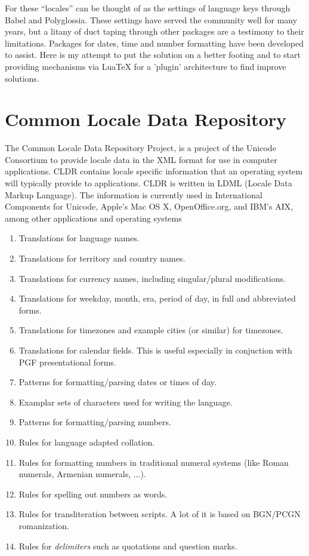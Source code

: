 For \latex these ``locales'' can be thought of as the settings of language keys through Babel and Polyglossia. These settings have served the community well for many years, but a litany of duct taping through other packages are a testimony to their limitations. Packages for dates, time and number formatting have been developed to assist. Here is my attempt to put the solution on a better footing and to start providing mechanisms via LuaTeX for a 'plugin'
architecture to find improve solutions. 

\section{Common Locale Data Repository}

The Common Locale Data Repository Project, is a project of the Unicode Consortium to provide locale data in the XML format for use in computer applications. CLDR contains locale specific information that an operating system will typically provide to applications. CLDR is written in LDML (Locale Data Markup Language). The information is currently used in International Components for Unicode, Apple's Mac OS X, OpenOffice.org, and IBM's AIX, among other applications and operating systems

\begin{enumerate}
\item Translations for language names.
\item Translations for territory and country names.
\item Translations for currency names, including singular/plural modifications.
\item Translations for weekday, month, era, period of day, in full and abbreviated forms.
\item Translations for timezones and example cities (or similar) for timezones.
\item Translations for calendar fields. This is useful especially in conjuction with PGF presentational forms.
\item Patterns for formatting/parsing dates or times of day.
\item Examplar sets of characters used for writing the language.
\item Patterns for formatting/parsing numbers.
\item Rules for language adapted collation. \label{collation}
\item Rules for formatting numbers in traditional numeral systems (like Roman numerals, Armenian numerals, ...).
\item Rules for spelling out numbers as words.
\item Rules for transliteration between scripts. A lot of it is based on BGN/PCGN romanization.
\item Rules for \emph{delimiters} such as quotations and question marks.
\end{enumerate}

